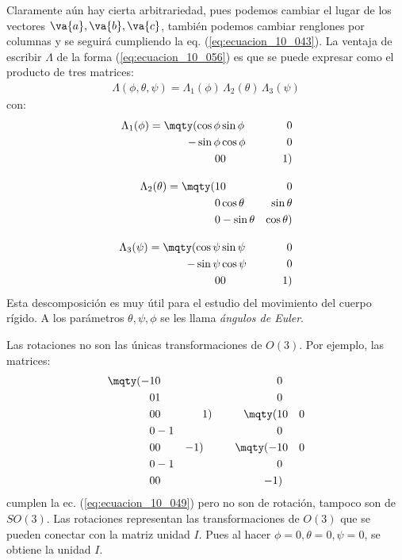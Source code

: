 Claramente aún hay cierta arbitrariedad, pues podemos cambiar el lugar de los vectores $\va{a}, \va{b}, \va{c}$, también podemos cambiar renglones por columnas y se seguirá cumpliendo la eq. (\ref{eq:ecuacion_10_043}). La ventaja de escribir $\Lambda$ de la forma (\ref{eq:ecuacion_10_056}) es que se puede expresar como el producto de tres matrices:
\begin{align}
\Lambda (\phi, \theta, \psi) = \Lambda_{1} (\phi) \, \Lambda_{2} (\theta) \, \Lambda_{3} (\psi) 
\label{eq:ecuacion_10_057}
\end{align}
con:
\begin{align}
\Lambda_{1} (\phi) = \mqty(\cos \phi & \sin \phi & 0 \\ - \sin \phi & \cos \phi & 0 \\ 0 & 0 & 1) \label{eq:ecuacion_10_058} \\[1em]
\Lambda_{2} (\theta) = \mqty(1 & 0 & 0 \\ 0 & \cos \theta & \sin \theta \\ 0 & - \sin \theta & \cos \theta) \label{eq:ecuacion_10_059} \\[1em]
\Lambda_{3} (\psi) = \mqty(\cos \psi & \sin \psi & 0 \\ - \sin \psi & \cos \psi & 0 \\ 0 & 0 & 1) \label{eq:ecuacion_10_060}
\end{align}
Esta descomposición es muy útil para el estudio del movimiento del cuerpo rígido. A los parámetros $\theta, \psi, \phi$ se les llama \emph{ángulos de Euler}.
\par
Las rotaciones no son las únicas transformaciones de $O(3)$. Por ejemplo, las matrices:
\begin{align}
\mqty(-1 & 0 & 0 \\ 0 & 1 & 0 \\ 0 & 0 & 1) \hspace{1cm} \mqty(1 & 0 & 0 \\ 0 & -1 & 0 \\ 0 & 0 & -1) \hspace{1cm} \mqty(-1 & 0 & 0 \\ 0 & -1 & 0 \\ 0 & 0 & -1)
\label{eq:ecuacion_10_061}
\end{align}
cumplen la ec. (\ref{eq:ecuacion_10_049}) pero no son de rotación, tampoco son de $SO(3)$. Las rotaciones representan las transformaciones de $O(3)$ que se pueden conectar con la matriz unidad $I$. Pues al hacer $\phi = 0, \theta = 0, \psi = 0$, se obtiene la unidad $I$.

